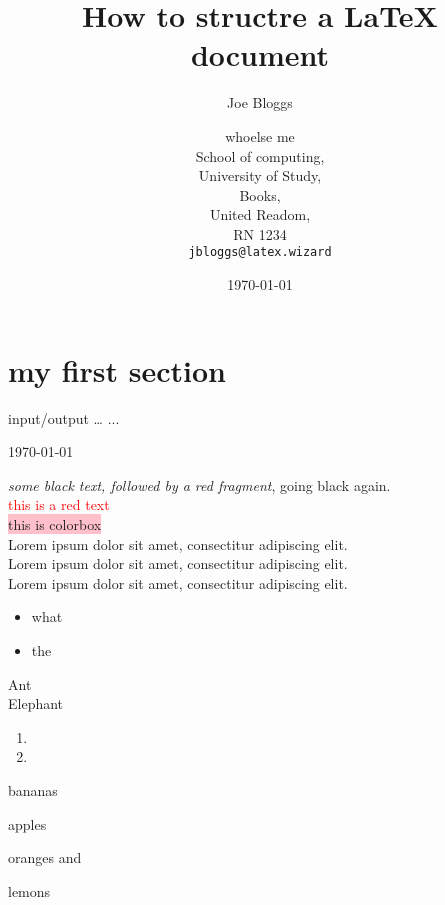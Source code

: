 \documentclass{article}
\title{How to structre a \LaTeX{} document}
\author{Joe Bloggs \and whoelse me \\
        School of computing, \\
        University of Study, \\
        Books, \\
        United Readom, \\
        RN 1234\\
        \texttt{jbloggs@latex.wizard}}
\date{\today}
\begin{document}
\maketitle
\vfill
\tableofcontents
\clearpage

\section{my first section}

input\slash output
\ldots
...

\today

\emph{some black text, \color{red} followed by a red fragment}, going black again. \\
\textcolor{red} {this is a red text} \\
\colorbox{pink}{this is colorbox} \\

Lorem ipsum dolor sit amet, consectitur adipiscing elit. \\
\renewcommand*\rmdefault{pag}
Lorem ipsum dolor sit amet, consectitur adipiscing elit. \\
\renewcommand*\rmdefault{iwona}
Lorem ipsum dolor sit amet, consectitur adipiscing elit. \\

\begin{itemize}
   \item what
   \item the
\end{itemize}

\begin{description}
    \item [Ant] \blindtext
    \item [Elephant] \blindtext
\end{description}

\begin{enumerate}
   \item \blindtext
   \item \blindtext
\end{enumerate}

\noindent
\begin{enumerate*}[label={\alph*) }, font={\color{green}\bfseries}]
\item bananas \\
\item apples \\
\item oranges and \\
\item lemons \\
\end{enumerate*}
\end{document}
